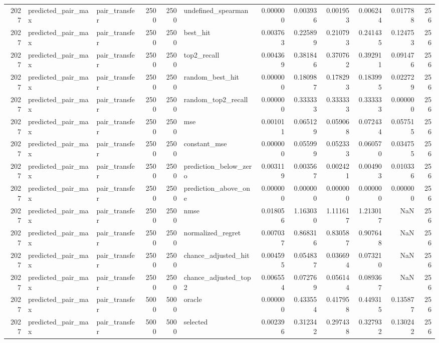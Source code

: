 \begin{tabular}{rllrrlrrrrrr}
2027 & predicted_pair_max & pair_transfer & 2500 & 2500 & undefined_spearman & 0.000000 & 0.003936 & 0.001953 & 0.006244 & 0.017788 & 256 \\
2027 & predicted_pair_max & pair_transfer & 2500 & 2500 & best_hit & 0.003763 & 0.225899 & 0.210793 & 0.241435 & 0.124753 & 256 \\
2027 & predicted_pair_max & pair_transfer & 2500 & 2500 & top2_recall & 0.004369 & 0.381846 & 0.370762 & 0.392911 & 0.091476 & 256 \\
2027 & predicted_pair_max & pair_transfer & 2500 & 2500 & random_best_hit & 0.000000 & 0.180987 & 0.178293 & 0.183995 & 0.022729 & 256 \\
2027 & predicted_pair_max & pair_transfer & 2500 & 2500 & random_top2_recall & 0.000000 & 0.333333 & 0.333333 & 0.333333 & 0.000000 & 256 \\
2027 & predicted_pair_max & pair_transfer & 2500 & 2500 & mse & 0.001011 & 0.065129 & 0.059068 & 0.072434 & 0.057515 & 256 \\
2027 & predicted_pair_max & pair_transfer & 2500 & 2500 & constant_mse & 0.000000 & 0.055999 & 0.052333 & 0.060570 & 0.034755 & 256 \\
2027 & predicted_pair_max & pair_transfer & 2500 & 2500 & prediction_below_zero & 0.003119 & 0.003567 & 0.002421 & 0.004903 & 0.010336 & 256 \\
2027 & predicted_pair_max & pair_transfer & 2500 & 2500 & prediction_above_one & 0.000000 & 0.000000 & 0.000000 & 0.000000 & 0.000000 & 256 \\
2027 & predicted_pair_max & pair_transfer & 2500 & 2500 & nmse & 0.018056 & 1.163030 & 1.111617 & 1.213017 & NaN & 256 \\
2027 & predicted_pair_max & pair_transfer & 2500 & 2500 & normalized_regret & 0.007037 & 0.868316 & 0.830587 & 0.907648 & NaN & 256 \\
2027 & predicted_pair_max & pair_transfer & 2500 & 2500 & chance_adjusted_hit & 0.004595 & 0.054837 & 0.036694 & 0.073210 & NaN & 256 \\
2027 & predicted_pair_max & pair_transfer & 2500 & 2500 & chance_adjusted_top2 & 0.006554 & 0.072769 & 0.056144 & 0.089367 & NaN & 256 \\
2027 & predicted_pair_max & pair_transfer & 5000 & 5000 & oracle & 0.000000 & 0.433554 & 0.417958 & 0.449315 & 0.135877 & 256 \\
2027 & predicted_pair_max & pair_transfer & 5000 & 5000 & selected & 0.002396 & 0.312342 & 0.297438 & 0.327932 & 0.130242 & 256 \\

\end{tabular}
